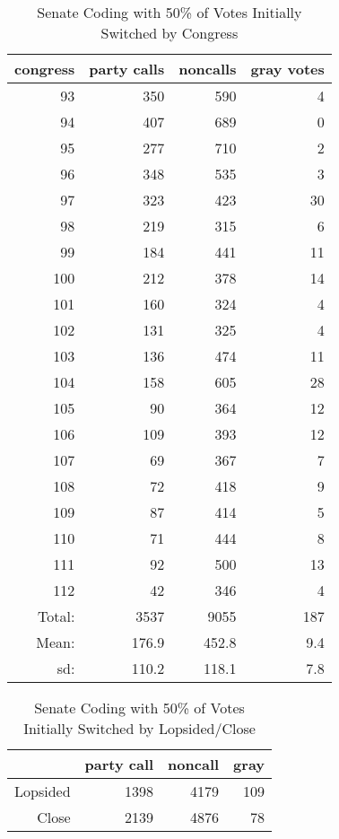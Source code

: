\documentclass[12pt]{article}
\begin{document}
\begin{table}[ht]
	\centering
	\caption{Senate Coding with 50\% of Votes Initially Switched by Congress}
	\begin{tabular}{rrrr}
		\hline
		congress & party calls & noncalls & gray votes \\ 
		\hline
		93 & 350 & 590 &   4 \\ 
		94 & 407 & 689 &   0 \\ 
		95 & 277 & 710 &   2 \\ 
		96 & 348 & 535 &   3 \\ 
		97 & 323 & 423 &  30 \\ 
		98 & 219 & 315 &   6 \\ 
		99 & 184 & 441 &  11 \\ 
		100 & 212 & 378 &  14 \\ 
		101 & 160 & 324 &   4 \\ 
		102 & 131 & 325 &   4 \\ 
		103 & 136 & 474 &  11 \\ 
		104 & 158 & 605 &  28 \\ 
		105 &  90 & 364 &  12 \\ 
		106 & 109 & 393 &  12 \\ 
		107 &  69 & 367 &   7 \\ 
		108 &  72 & 418 &   9 \\ 
		109 &  87 & 414 &   5 \\ 
		110 &  71 & 444 &   8 \\ 
		111 &  92 & 500 &  13 \\ 
		112 &  42 & 346 &   4 \\ 
		\hline
		Total: & 3537 & 9055 & 187 \\
		Mean: & 176.9 & 452.8 & 9.4 \\
		sd: & 110.2 & 118.1 & 7.8 \\
		\hline
	\end{tabular}
\end{table}

\begin{table}[ht]
	\centering
	\caption{Senate Coding with 50\% of Votes Initially Switched by Lopsided/Close}
	\begin{tabular}{rrrr}
		\hline
		& party call  & noncall & gray \\ 
		\hline
		Lopsided & 1398 & 4179 & 109 \\ 
		Close & 2139 & 4876 & 78 \\ 
		\hline
	\end{tabular}
\end{table}
\end{document}
